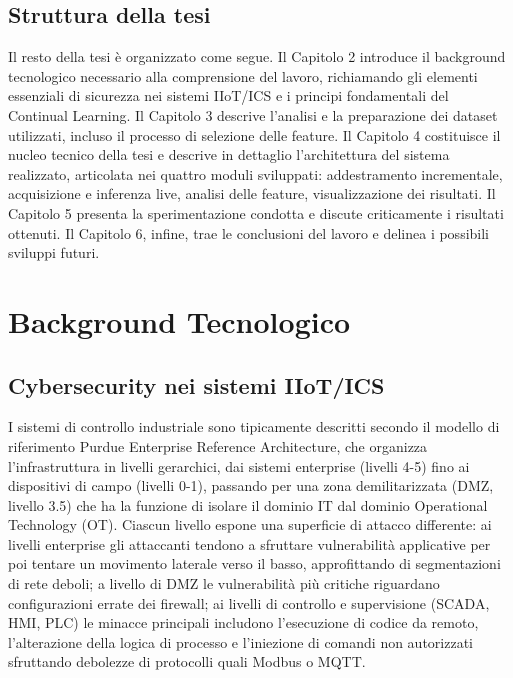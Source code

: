 \documentclass[12pt,a4paper]{report}
\begin{document}
\section{Struttura della tesi}

Il resto della tesi è organizzato come segue. Il Capitolo 2 introduce il background tecnologico necessario alla comprensione del lavoro, richiamando gli elementi essenziali di sicurezza nei sistemi IIoT/ICS e i principi fondamentali del Continual Learning. Il Capitolo 3 descrive l'analisi e la preparazione dei dataset utilizzati, incluso il processo di selezione delle feature. Il Capitolo 4 costituisce il nucleo tecnico della tesi e descrive in dettaglio l'architettura del sistema realizzato, articolata nei quattro moduli sviluppati: addestramento incrementale, acquisizione e inferenza live, analisi delle feature, visualizzazione dei risultati. Il Capitolo 5 presenta la sperimentazione condotta e discute criticamente i risultati ottenuti. Il Capitolo 6, infine, trae le conclusioni del lavoro e delinea i possibili sviluppi futuri.

\chapter{Background Tecnologico}

\section{Cybersecurity nei sistemi IIoT/ICS}

I sistemi di controllo industriale sono tipicamente descritti secondo il modello di riferimento Purdue Enterprise Reference Architecture, che organizza l'infrastruttura in livelli gerarchici, dai sistemi enterprise (livelli 4-5) fino ai dispositivi di campo (livelli 0-1), passando per una zona demilitarizzata (DMZ, livello 3.5) che ha la funzione di isolare il dominio IT dal dominio Operational Technology (OT). Ciascun livello espone una superficie di attacco differente: ai livelli enterprise gli attaccanti tendono a sfruttare vulnerabilità applicative per poi tentare un movimento laterale verso il basso, approfittando di segmentazioni di rete deboli; a livello di DMZ le vulnerabilità più critiche riguardano configurazioni errate dei firewall; ai livelli di controllo e supervisione (SCADA, HMI, PLC) le minacce principali includono l'esecuzione di codice da remoto, l'alterazione della logica di processo e l'iniezione di comandi non autorizzati sfruttando debolezze di protocolli quali Modbus o MQTT.
\end{document}

